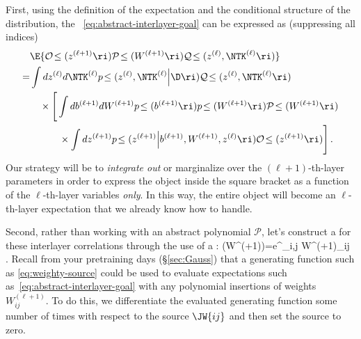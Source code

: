 First, using the definition of the expectation and the conditional structure of the distribution, the ~\eqref{eq:abstract-interlayer-goal} can be expressed as (suppressing all indices)
\begin{align}\label{eq:decompose-interlayer}
&\E{\mathcal{O}\!\le(z^{(\ell+1)}\ri)\mathcal{P}\!\le(W^{(\ell+1)}\ri)\mathcal{Q}\!\le(z^{(\ell)},  \NTK^{(\ell)} \ri)}\, \\
=&\int dz^{(\ell)} d\NTK^{(\ell)} p\!\le(z^{(\ell)}, \NTK^{(\ell)}\Big\vert \D\ri)\mathcal{Q}\!\le(z^{(\ell)},  \NTK^{(\ell)} \ri)\, \notag\\
&\quad \times\Bigg[\int db^{(\ell+1)}dW^{(\ell+1)} p\!\le(b^{(\ell+1)}\ri)p\!\le(W^{(\ell+1)}\ri)\mathcal{P}\!\le(W^{(\ell+1)}\ri)\, \notag\\
&\quad \quad\quad \times\int dz^{(\ell+1)} p\!\le(z^{(\ell+1)}\Big\vert b^{(\ell+1)},W^{(\ell+1)},z^{(\ell)}\ri) \mathcal{O}\!\le(z^{(\ell+1)}\ri)\Bigg]\, .\notag
\end{align}
Our strategy will be to \emph{integrate out} or marginalize over the $(\ell+1)$-th-layer parameters in order to express the object inside the square bracket as a function of the $\ell$-th-layer variables \emph{only}. In this way, 
the entire object will become an $\ell$-th-layer expectation that we already know how to handle.



Second, rather than working with an abstract polynomial $\mathcal{P}$, let's construct a  for these interlayer correlations through the use of a : 
\be\label{eq:weighty-source}
\!\le(W^{(\ell+1)}\ri)=e^{\sum_{i,j} W^{(\ell+1)}_{ij}}\, .
\ee
Recall from your pretraining days (\S\ref{sec:Gauss}) that a generating function such as \eqref{eq:weighty-source} could be used to evaluate expectations such as~\eqref{eq:abstract-interlayer-goal} with any polynomial insertions of weights $W^{(\ell+1)}_{ij}$. To do this, we differentiate the evaluated generating function some number of times with respect to the source $\JW{ij}$ and then set the source to zero.


